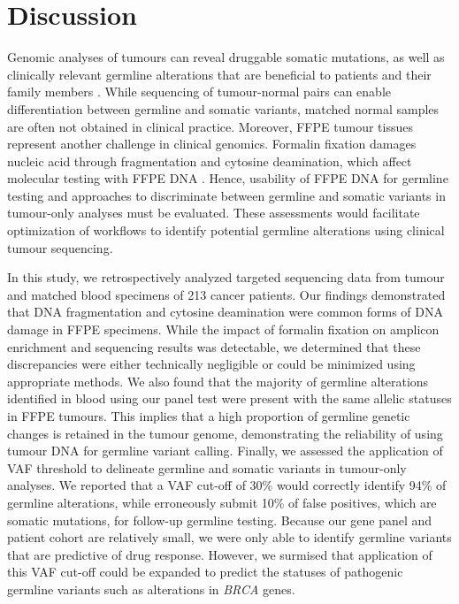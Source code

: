 
\chapter{Discussion}
\label{ch:Discussion}

Genomic analyses of tumours can reveal druggable somatic mutations, as well as clinically relevant germline alterations that are beneficial to patients and their family members \cite{Meric-Bernstam2016, Schrader2015, Jones2015a}. While sequencing of tumour-normal pairs can enable differentiation between germline and somatic variants, matched normal samples are often not obtained in clinical practice. Moreover, FFPE tumour tissues represent another challenge in clinical genomics. Formalin fixation damages nucleic acid through fragmentation and cytosine deamination, which affect molecular testing with FFPE DNA \cite{Do2015a, Kim2017, Ofner2017, Oh2015, Wong2013, Wong2014, Sikorsky2007}. Hence, usability of FFPE DNA for germline testing and approaches to discriminate between germline and somatic variants in tumour-only analyses must be evaluated. These assessments would facilitate optimization of workflows to identify potential germline alterations using clinical tumour sequencing.

In this study, we retrospectively analyzed targeted sequencing data from tumour and matched blood specimens of 213 cancer patients. Our findings demonstrated that DNA fragmentation and cytosine deamination were common forms of DNA damage in FFPE specimens. While the impact of formalin fixation on amplicon enrichment and sequencing results was detectable, we determined that these discrepancies were either technically negligible or could be minimized using appropriate methods. We also found that the majority of germline alterations identified in blood using our panel test were present with the same allelic statuses in FFPE tumours. This implies that a high proportion of germline genetic changes is retained in the tumour genome, demonstrating the reliability of using tumour DNA for germline variant calling. Finally, we assessed the application of VAF threshold to delineate germline and somatic variants in tumour-only analyses. We reported that a VAF cut-off of 30\% would correctly identify 94\% of germline alterations, while erroneously submit 10\% of false positives, which are somatic mutations, for follow-up germline testing. Because our gene panel and patient cohort are relatively small, we were only able to identify germline variants that are predictive of drug response. However, we surmised that application of this VAF cut-off could be expanded to predict the statuses of pathogenic germline variants such as alterations in \textit{BRCA} genes.

